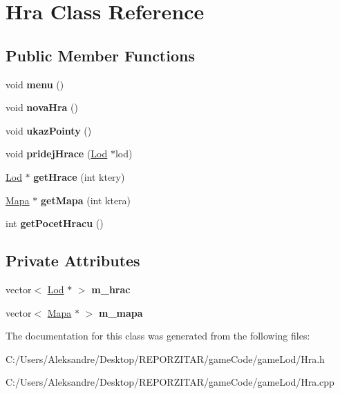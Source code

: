 \hypertarget{class_hra}{}\section{Hra Class Reference}
\label{class_hra}
\subsection*{Public Member Functions}
\begin{DoxyCompactItemize}
\item 
\mbox{\label{class_hra_aa230ba445a111f90ab5b78f048999f31}} 
void {\bfseries menu} ()
\item 
\mbox{\label{class_hra_a523d16c7ac7f6be845b081e3e4d6e8c3}} 
void {\bfseries nova\+Hra} ()
\item 
\mbox{\label{class_hra_a8aa8ae0e74ccf7d6c668487c36c47231}} 
void {\bfseries ukaz\+Pointy} ()
\item 
\mbox{\label{class_hra_a8094eac30c362e844de120f5a026b45a}} 
void {\bfseries pridej\+Hrace} (\hyperlink{class_lod}{Lod} $\ast$lod)
\item 
\mbox{\label{class_hra_adcbd2bc2eb01bc47d14f31e8f5532a1a}} 
\hyperlink{class_lod}{Lod} $\ast$ {\bfseries get\+Hrace} (int ktery)
\item 
\mbox{\label{class_hra_a5ec226d5e27ec90369dc30ffd0ee4c56}} 
\hyperlink{class_mapa}{Mapa} $\ast$ {\bfseries get\+Mapa} (int ktera)
\item 
\mbox{\label{class_hra_a96acf4c7f42b642124b6cd06c29ba0b1}} 
int {\bfseries get\+Pocet\+Hracu} ()
\end{DoxyCompactItemize}
\subsection*{Private Attributes}
\begin{DoxyCompactItemize}
\item 
\mbox{\label{class_hra_a8409650939eb699aef9d6ea99690660e}} 
vector$<$ \hyperlink{class_lod}{Lod} $\ast$ $>$ {\bfseries m\+\_\+hrac}
\item 
\mbox{\label{class_hra_accdb722db23f27e2a581cf1bd70da467}} 
vector$<$ \hyperlink{class_mapa}{Mapa} $\ast$ $>$ {\bfseries m\+\_\+mapa}
\end{DoxyCompactItemize}


The documentation for this class was generated from the following files\+:\begin{DoxyCompactItemize}
\item 
C\+:/\+Users/\+Aleksandre/\+Desktop/\+R\+E\+P\+O\+R\+Z\+I\+T\+A\+R/game\+Code/game\+Lod/Hra.\+h\item 
C\+:/\+Users/\+Aleksandre/\+Desktop/\+R\+E\+P\+O\+R\+Z\+I\+T\+A\+R/game\+Code/game\+Lod/Hra.\+cpp\end{DoxyCompactItemize}
